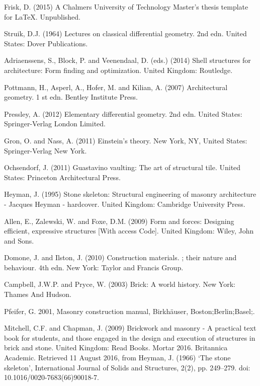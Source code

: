 
\begin{thebibliography}{69}

 Frisk, D. (2015) A Chalmers University of Technology Master's thesis template for \LaTeX . Unpublished.

 Struik, D.J. (1964) Lectures on classical differential geometry. 2nd edn. United States: Dover Publications.

Adriaenssens, S., Block, P. and Veenendaal, D. (eds.) (2014) Shell structures for architecture: Form finding and optimization. United Kingdom: Routledge.



Pottmann, H., Asperl, A., Hofer, M. and Kilian, A. (2007) Architectural geometry. 1 st edn. Bentley Institute Press.

 Pressley, A. (2012) Elementary differential geometry. 2nd edn. United States: Springer-Verlag London Limited.

Gron, O. and Nass, A. (2011) Einstein’s theory. New York, NY, United States: Springer-Verlag New York.

Ochsendorf, J. (2011) Guastavino vaulting: The art of structural tile. United States: Princeton Architectural Press.

Heyman, J. (1995) Stone skeleton: Structural engineering of masonry architecture - Jacques Heyman - hardcover. United Kingdom: Cambridge University Press.

Allen, E., Zalewski, W. and Foxe, D.M. (2009) Form and forces: Designing efficient, expressive structures [With access Code]. United Kingdom: Wiley, John and Sons.

Domone, J. and Ilston, J. (2010) Construction materials. ; their nature and behaviour. 4th edn. New York: Taylor and Francis Group.

Campbell, J.W.P. and Pryce, W. (2003) Brick: A world history. New York: Thames And Hudson.

Pfeifer, G. 2001, Masonry construction manual, Birkhäuser, Boston;Berlin;Basel;.

Mitchell, C.F. and Chapman, J. (2009) Brickwork and masonry - A practical text book for students, and those engaged in the design and execution of structures in brick and stone. United Kingdom: Read Books.
Mortar 2016. Britannica Academic. Retrieved 11 August 2016, from
Heyman, J. (1966) ‘The stone skeleton’, International Journal of Solids and Structures, 2(2), pp. 249–279. doi: 10.1016/0020-7683(66)90018-7.


\end{thebibliography}
